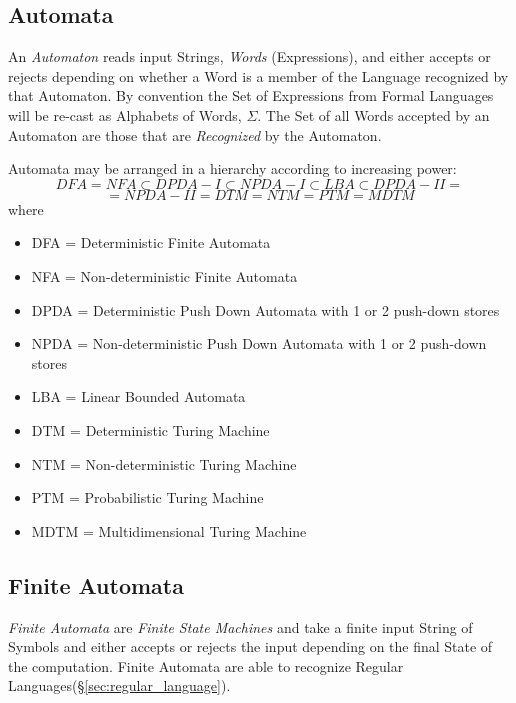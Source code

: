 \subsection{Automata} \label{sec:automata}

An \emph{Automaton} reads input Strings, \emph{Words} (Expressions),
and either accepts or rejects depending on whether a Word is a member
of the Language recognized by that Automaton. By convention the Set of
Expressions from Formal Languages will be re-cast as Alphabets of
Words, $\Sigma$. The Set of all Words accepted by an Automaton are
those that are \emph{Recognized} by the Automaton.

Automata may be arranged in a hierarchy according to increasing power:
\[
    DFA = NFA \subset DPDA-I \subset NPDA-I \subset LBA \subset DPDA-II =
\]\[
    = NPDA-II = DTM = NTM = PTM = MDTM
\]
where
\begin{itemize}
\item DFA = Deterministic Finite Automata
\item NFA = Non-deterministic Finite Automata
\item DPDA = Deterministic Push Down Automata with 1
  or 2 push-down stores
\item NPDA = Non-deterministic Push Down Automata
  with 1 or 2 push-down stores
\item LBA = Linear Bounded Automata
\item DTM = Deterministic Turing Machine
\item NTM = Non-deterministic Turing Machine
\item PTM = Probabilistic Turing Machine
\item MDTM = Multidimensional Turing Machine
\end{itemize}



\subsection{Finite Automata}\label{sec:finite_automata}

\emph{Finite Automata} are \emph{Finite State Machines} and take a
finite input String of Symbols and either accepts or rejects the input
depending on the final State of the computation. Finite Automata are
able to recognize Regular Languages(\S\ref{sec:regular_language}).



